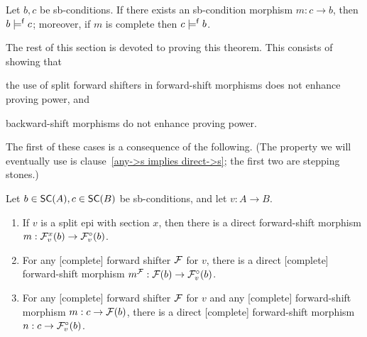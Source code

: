 \begin{theorem}
Let $b,c$ be sb-conditions. If there exists an sb-condition morphism $m:c\to b$, then $b\pentails c$; moreover, if $m$ is complete then $c\pentails b$.
\end{theorem}
%
The rest of this section is devoted to proving this theorem. This consists of showing that
\begin{inumerate}
\item the use of split forward shifters in forward-shift morphisms does not enhance proving power, and 
\item backward-shift morphisms do not enhance proving power.
\end{inumerate}
%
The first of these cases is a consequence of the following. (The property we will eventually use is clause~\ref{any->s implies direct->s}; the first two are stepping stones.)

\begin{lemma}
Let $b\in \SC A,c\in \SC B$ be sb-conditions, and let $v:A\to B$.
\begin{enumerate}[topsep=\smallskipamount]
\item\label{direct->split} If $v$ is a split epi with section $x$, then there is a direct forward-shift morphism $m: \rF v x(b) \to \dF v(b)$.
\item\label{direct->any} For any [complete] forward shifter $\cF$ for $v$, there is a direct [complete] forward-shift morphism $m^\cF:\cF(b) \to \dF v(b)$.
\item\label{any->s implies direct->s} For any [complete] forward shifter $\cF$ for $v$ and any [complete] forward-shift morphism $m:c \to \cF(b)$, there is a direct [complete] forward-shift morphism $n:c \to \dF v(b)$.
\end{enumerate}
\end{lemma}


